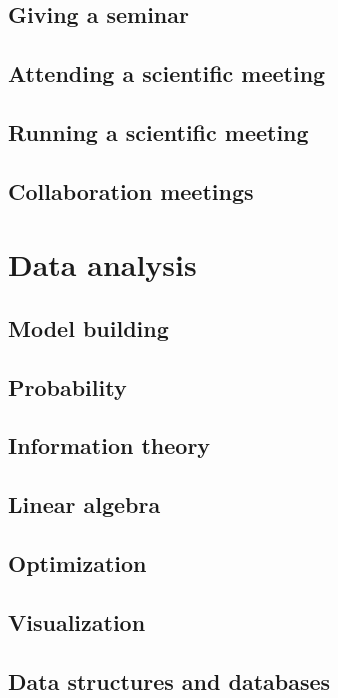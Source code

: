 \documentclass[letterpaper]{book}
\begin{document}
\chapter{Giving a seminar}

\chapter{Attending a scientific meeting}

\chapter{Running a scientific meeting}

\chapter{Collaboration meetings}

\part{Data analysis}

\chapter{Model building}

\chapter{Probability}

\chapter{Information theory}

\chapter{Linear algebra}

\chapter{Optimization}

\chapter{Visualization}

\chapter{Data structures and databases}
\end{document}
